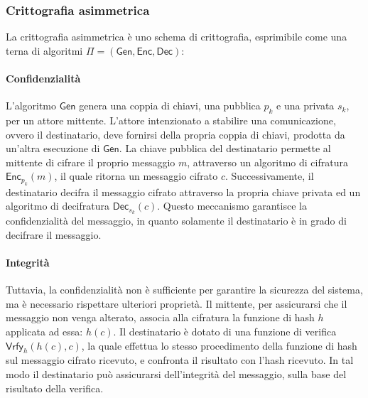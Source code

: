 \documentclass[a4paper,12pt]{article}
\begin{document}
\subsubsection{Crittografia asimmetrica}
La crittografia asimmetrica è uno schema di crittografia, esprimibile come una terna di algoritmi $\Pi=\mathsf{(Gen, Enc, Dec)}$:
\paragraph{Confidenzialità} 
L'algoritmo $\mathsf{Gen}$ genera una coppia di chiavi, una pubblica $p_k$ e una privata $s_k$, per un attore mittente. L'attore intenzionato a stabilire una comunicazione, ovvero il destinatario, deve fornirsi della propria coppia di chiavi, prodotta da un'altra esecuzione di $\mathsf{Gen}$. 
La chiave pubblica del destinatario permette al mittente di cifrare il proprio messaggio $m$, attraverso un algoritmo di cifratura $\mathsf{Enc}_{p_k}(m)$, il quale ritorna un messaggio cifrato $c$. Successivamente, il destinatario decifra il messaggio cifrato attraverso la propria chiave privata ed un algoritmo di decifratura $\mathsf{Dec}_{s_k}(c)$.
Questo meccanismo garantisce la confidenzialità del messaggio, in quanto solamente il destinatario è in grado di decifrare il messaggio.
\paragraph{Integrità}
Tuttavia, la confidenzialità non è sufficiente per garantire la sicurezza del sistema, ma è necessario rispettare ulteriori proprietà.
Il mittente, per assicurarsi che il messaggio non venga alterato, associa alla cifratura la funzione di hash $h$ applicata ad essa: $h(c)$. Il destinatario è dotato di una funzione di verifica $\mathsf{Vrfy}_{h}(h(c),c)$, la quale effettua lo stesso procedimento della funzione di hash sul messaggio cifrato ricevuto, e confronta il risultato con l'hash ricevuto. In tal modo il destinatario può assicurarsi dell'integrità del messaggio, sulla base del risultato della verifica.  
\end{document}
